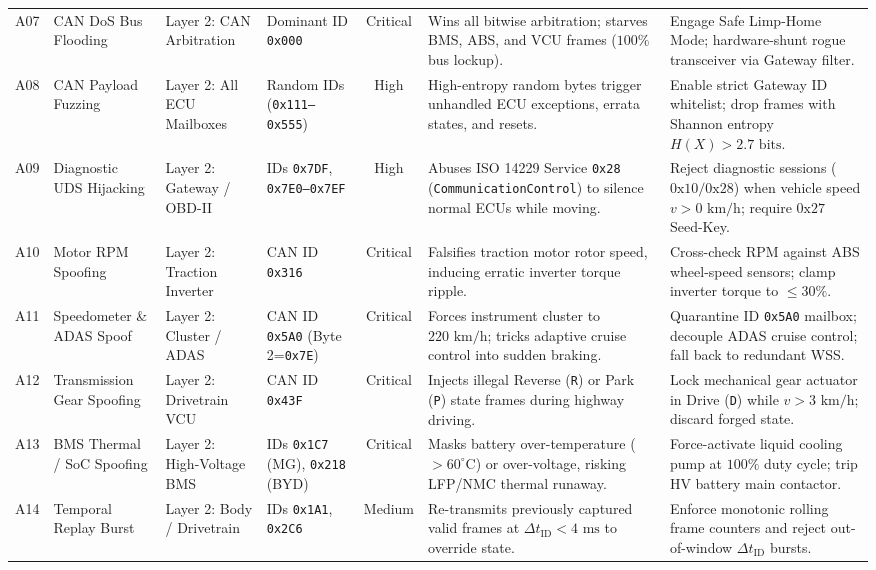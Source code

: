 \documentclass[conference]{IEEEtran}
\begin{document}
\begin{table}[!t]
{\begin{tabular}{l l l l c p{4.2cm} p{4.4cm}}
\midrule
A07 & CAN DoS Bus Flooding & Layer 2: CAN Arbitration & Dominant ID \texttt{0x000} & Critical & Wins all bitwise arbitration; starves BMS, ABS, and VCU frames ($100\%$ bus lockup). & Engage Safe Limp-Home Mode; hardware-shunt rogue transceiver via Gateway filter. \\
A08 & CAN Payload Fuzzing & Layer 2: All ECU Mailboxes & Random IDs (\texttt{0x111--0x555}) & High & High-entropy random bytes trigger unhandled ECU exceptions, errata states, and resets. & Enable strict Gateway ID whitelist; drop frames with Shannon entropy $H(X) > 2.7\text{ bits}$. \\
A09 & Diagnostic UDS Hijacking & Layer 2: Gateway / OBD-II & IDs \texttt{0x7DF}, \texttt{0x7E0--0x7EF} & High & Abuses ISO 14229 Service \texttt{0x28} (\texttt{CommunicationControl}) to silence normal ECUs while moving. & Reject diagnostic sessions ($0\text{x}10/0\text{x}28$) when vehicle speed $v > 0\text{ km/h}$; require $0\text{x}27$ Seed-Key. \\
A10 & Motor RPM Spoofing & Layer 2: Traction Inverter & CAN ID \texttt{0x316} & Critical & Falsifies traction motor rotor speed, inducing erratic inverter torque ripple. & Cross-check RPM against ABS wheel-speed sensors; clamp inverter torque to $\le 30\%$. \\
A11 & Speedometer \& ADAS Spoof & Layer 2: Cluster / ADAS & CAN ID \texttt{0x5A0} (Byte 2=\texttt{0x7E}) & Critical & Forces instrument cluster to $220\text{ km/h}$; tricks adaptive cruise control into sudden braking. & Quarantine ID \texttt{0x5A0} mailbox; decouple ADAS cruise control; fall back to redundant WSS. \\
A12 & Transmission Gear Spoofing & Layer 2: Drivetrain VCU & CAN ID \texttt{0x43F} & Critical & Injects illegal Reverse (\texttt{R}) or Park (\texttt{P}) state frames during highway driving. & Lock mechanical gear actuator in Drive (\texttt{D}) while $v > 3\text{ km/h}$; discard forged state. \\
A13 & BMS Thermal / SoC Spoofing & Layer 2: High-Voltage BMS & IDs \texttt{0x1C7} (MG), \texttt{0x218} (BYD) & Critical & Masks battery over-temperature ($>60^\circ\text{C}$) or over-voltage, risking LFP/NMC thermal runaway. & Force-activate liquid cooling pump at $100\%$ duty cycle; trip HV battery main contactor. \\
A14 & Temporal Replay Burst & Layer 2: Body / Drivetrain & IDs \texttt{0x1A1}, \texttt{0x2C6} & Medium & Re-transmits previously captured valid frames at $\Delta t_{\text{ID}} < 4\text{ ms}$ to override state. & Enforce monotonic rolling frame counters and reject out-of-window $\Delta t_{\text{ID}}$ bursts. \\
\bottomrule
\end{tabular}%
}
\end{table}
\end{document}
